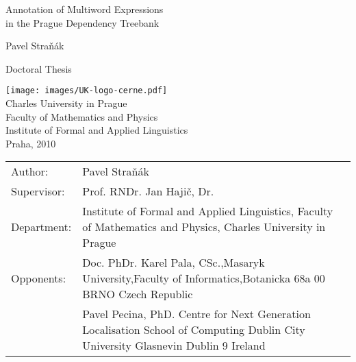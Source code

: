 \documentclass[11pt, a4paper, twopage, titlepage]{book}
\begin{document}
\begin{titlepage}
\setlength\voffset{3cm}
\centering

{\fontsize{21}{32}\selectfont
Annotation of Multiword Expressions \\[3mm]
 in the Prague Dependency Treebank }
\vspace{4cm}

\fontsize{18}{18}\selectfont Pavel Straňák
\vspace{3cm}

\fontsize{12}{14}\selectfont   Doctoral Thesis\\
\vspace{2cm}

\texttt{[image: images/UK-logo-cerne.pdf]}\\
\bigskip
Charles University in Prague\\
Faculty of Mathematics and Physics\\
Institute of Formal and Applied Linguistics\\
\vspace{0.8cm}
Praha, 2010
\end{titlepage}

\phantom{nic}
\thispagestyle{empty}

\begin{table}[htdp]
\begin{center}
\begin{tabular}{lp{7cm}}
Author: & Pavel Straňák \\[1cm]
Supervisor: & Prof. RNDr. Jan Hajič, Dr. \\[1cm]
Department: & Institute of Formal and Applied Linguistics, Faculty of Mathematics and Physics, Charles University in Prague\\[1cm]
Opponents: & 
Doc. PhDr. Karel Pala, CSc.,\newline Masaryk University,\newline Faculty of Informatics,\newline Botanicka 68a\newline 602 00 BRNO \newline Czech Republic \\[0.5cm]
               & Pavel Pecina, PhD.\newline
Centre for Next Generation Localisation\newline
School of Computing\newline
Dublin City University\newline
Glasnevin\newline
Dublin 9\newline
Ireland\\
\end{tabular}
\end{center}
\label{default}
\end{table}%


\tableofcontents
\listoffigures
\listoftables














\end{document}
